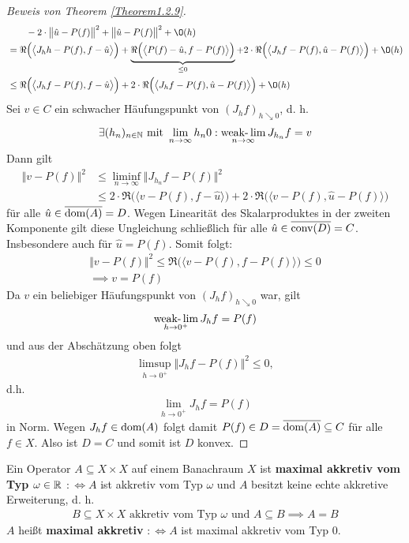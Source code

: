 \begin{proof}[Beweis von Theorem \ref{Theorem1.2.9}]
\begin{align*}
&\qquad-2\cdot\big\Vert\hat{u}-P(f)\big\Vert^2+\big\Vert\hat{u}-P(f)\big\Vert^2+\O(h)\\
&=\Re\Big(\big\langle J_h h-P(f),f-\hat{u}\big\rangle\Big)
+\underbrace{\Re\Big(\big\langle P(f)-\hat{u},f-P(f)\big\rangle\Big)}_{\leq0}
+2\cdot\Re\Big(\big\langle J_h f-P(f),\hat{u}-P(f)\big\rangle\Big)+\O(h)\\
&\leq
\Re\Big(\big\langle J_h f-P(f),f-\hat{u}\big\rangle\Big)
+2\cdot\Re\Big(\big\langle J_h f-P(f),\hat{u}-P(f)\big\rangle\Big)+\O(h)
\end{align*}
Sei $v\in C$ ein schwacher Häufungspunkt von $(J_h f)_{h\searrow 0}$, d. h.
\begin{align*}
\exists (h_n)_{n\in\mathbb{N}}\text{ mit } \lim\limits_{n\to\infty} h_n0:\operatorname*{\text{weak-}\lim}\limits_{n\to\infty} J_{h_n} f=v
\end{align*}
Dann gilt
\begin{align*}
\Vert v-P(f)\Vert^2 
&\leq\liminf\limits_{n\to\infty}\big\Vert J_{h_n} f-P(f)\big\Vert^2\\
&\leq
2\cdot\Re\Big(\big\langle v-P(f),f-\hat{u}\big\rangle\Big)
+2\cdot\Re\Big(\big\langle v-P(f),\hat{u}-P(f)\big\rangle\Big)
\end{align*}
für alle $\hat{u}\in\overline{\text{dom}(A)}=D$.
Wegen Linearität des Skalarproduktes in der zweiten Komponente gilt diese Ungleichung schließlich für alle $\hat{u}\in\overline{\text{conv}(D)}=C$. Insbesondere auch für $\hat{u}=P(f)$. Somit folgt:
\begin{align*}
\big\Vert v-P(f)\big\Vert^2
\leq
\Re\Big(\big\langle v-P(f),f-P(f)\big\rangle\Big)
\leq0\\
\implies
v=P(f)
\end{align*}
Da $v$ ein beliebiger Häufungspunkt von $(J_h f)_{h\searrow 0}$ war, gilt 
\begin{align*}
\operatorname*{\text{weak-}\lim}\limits_{h\to0^+} J_h f=P(f)
\end{align*}
und aus der Abschätzung oben folgt 
\begin{align*}
\limsup\limits_{h\to 0^+}\big\Vert J_h f-P(f)\big\Vert^2
\leq
0,
\end{align*}
d.h. 
\begin{align*}
\lim\limits_{h\to 0^+} J_h f=P(f)
\end{align*}
in Norm. Wegen $J_h f\in\text{dom}(A)$ folgt damit $P(f)\in D=\overline{\text{dom}(A)}\subseteq C$ für alle $f\in X$. Also ist $D=C$ und somit ist $D$ konvex.
\end{proof}

\begin{definition}
Ein Operator $A\subseteq X\times X$ auf einem Banachraum $X$ ist \textbf{maximal akkretiv vom Typ $\omega\in\mathbb{R}$} $:\Longleftrightarrow A$ ist akkretiv vom Typ $\omega$ und $A$ besitzt keine echte akkretive Erweiterung, d. h.
\begin{align*}
B\subseteq X\times X\text{ akkretiv vom Typ $\omega$ und }A\subseteq B
\implies A=B
\end{align*}
$A$ heißt \textbf{maximal akkretiv} $:\Longleftrightarrow A$ ist maximal akkretiv vom Typ 0.
\end{definition}

